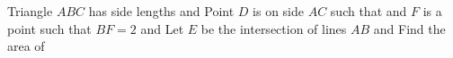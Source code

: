Triangle $ABC$ has side lengths   and   Point $D$ is on side $AC$ such that  and $F$ is a point such that $BF=2$ and   Let $E$ be the intersection of lines $AB$ and   Find the area of 